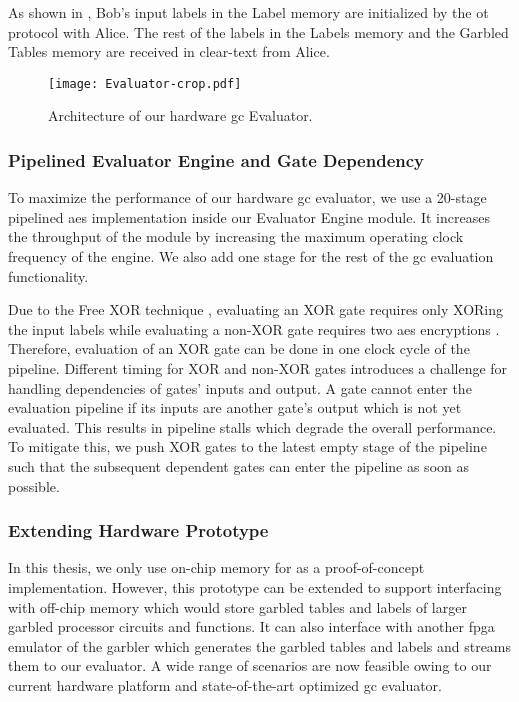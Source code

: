 As shown in , Bob's input labels in the Label memory are initialized by the \acrshort{ot} protocol with Alice.
The rest of the labels in the Labels memory and the Garbled Tables memory are received in clear-text from Alice.

\begin{figure}[h]
\centering
\texttt{[image: Evaluator-crop.pdf]}
\caption{Architecture of our hardware \acrshort{gc} Evaluator.}
\label{fig:evaluator}
\end{figure}

\subsubsection{Pipelined Evaluator Engine and Gate Dependency} \label{ssec:processor-hardware-pipeline}
To maximize the performance of our hardware \acrshort{gc} evaluator, we use a 20-stage pipelined \acrshort{aes} implementation \cite{hsing2013tiny} inside our Evaluator Engine module.
It increases the throughput of the module by increasing the maximum operating clock frequency of the engine.
We also add one stage for the rest of the \acrshort{gc} evaluation functionality.

Due to the Free XOR technique \cite{kolesnikov2008improved}, evaluating an XOR gate requires only XORing the input labels while evaluating a non-XOR gate requires two \acrshort{aes} encryptions \cite{zahur2015two}.
Therefore, evaluation of an XOR gate can be done in one clock cycle of the pipeline.
Different timing for XOR and non-XOR gates introduces a challenge for handling dependencies of gates' inputs and output.
A gate cannot enter the evaluation pipeline if its inputs are another gate's output which is not yet evaluated.
This results in pipeline stalls which degrade the overall performance.
To mitigate this, we push XOR gates to the latest empty stage of the pipeline such that the subsequent dependent gates can enter the pipeline as soon as possible.

\subsubsection{Extending Hardware Prototype} \label{ssec:processor-hardware-extend}
In this thesis, we only use on-chip memory for as a proof-of-concept implementation.
However, this prototype can be extended to support interfacing with off-chip memory which would store garbled tables and labels of larger garbled processor circuits and functions.
It can also interface with another \acrshort{fpga} emulator of the garbler which generates the garbled tables and labels and streams them to our evaluator.
A wide range of scenarios are now feasible owing to our current hardware platform and state-of-the-art optimized \acrshort{gc} evaluator.


